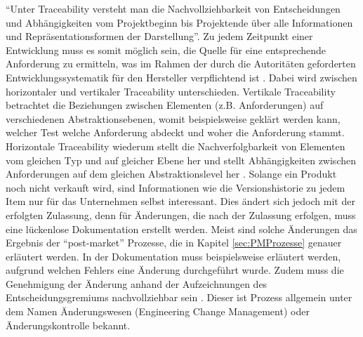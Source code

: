 \documentclass[a4paper,12pt]{report}
\begin{document}
"`Unter Traceability versteht man die Nachvollziehbarkeit von Entscheidungen und Abhängigkeiten vom Projektbeginn bis Projektende über alle Informationen und Repräsentationsformen der Darstellung"'\citep[][S. 407]{Rupp2002}. Zu jedem Zeitpunkt einer Entwicklung muss es somit möglich sein, die Quelle für eine entsprechende Anforderung zu ermitteln, was im Rahmen der durch die Autoritäten geforderten Entwicklungssystematik für den Hersteller verpflichtend ist \citep[vgl.][S. 117]{Johner2015}. Dabei wird zwischen horizontaler und vertikaler Traceability unterschieden. Vertikale Traceability betrachtet die Beziehungen zwischen Elementen (z.B. Anforderungen) auf verschiedenen Abstraktionsebenen, womit beispielsweise geklärt werden kann, welcher Test welche Anforderung abdeckt und woher die Anforderung stammt. Horizontale Traceability wiederum stellt die Nachverfolgbarkeit von Elementen vom gleichen Typ und auf gleicher Ebene her und stellt Abhängigkeiten zwischen Anforderungen auf dem gleichen Abstraktionslevel her \citep[vgl.][]{Ebert2014}. Solange ein Produkt noch nicht verkauft wird, sind Informationen wie die Versionshistorie zu jedem Item nur für das Unternehmen selbst interessant. Dies ändert sich jedoch mit der erfolgten Zulassung, denn für Änderungen, die nach der Zulassung erfolgen, muss eine lückenlose Dokumentation erstellt werden. Meist sind solche Änderungen das Ergebnis der "`post-market"' Prozesse, die in Kapitel \ref{sec:PMProzesse} genauer erläutert werden. In der Dokumentation muss beispielsweise erläutert werden, aufgrund welchen Fehlers eine Änderung durchgeführt wurde. Zudem muss die Genehmigung der Änderung anhand der Aufzeichnungen des Entscheidungsgremiums nachvollziehbar sein \citep[vgl.][S. 145f.]{Johner2015}. Dieser ist Prozess allgemein unter dem Namen Änderungswesen (Engineering Change Management) oder Änderungskontrolle bekannt.
\end{document}
